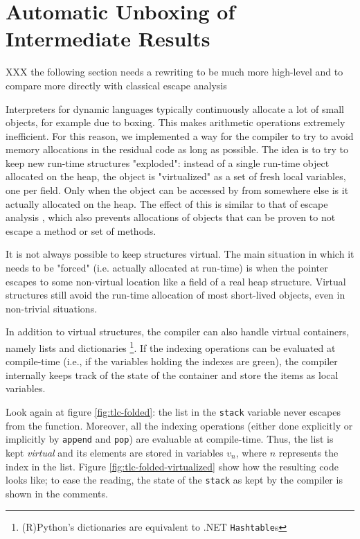 \section{Automatic Unboxing of Intermediate Results}
\label{sec:virtuals}

XXX the following section needs a rewriting to be much more high-level and to
compare more directly with classical escape analysis

Interpreters for dynamic languages typically continuously allocate a lot of small
objects, for example due to boxing. This makes arithmetic operations extremely
inefficient. For this reason, we
implemented a way for the compiler to try to avoid memory allocations in the
residual code as long as possible. The idea is to try to keep new
run-time structures "exploded": instead of a single run-time object allocated on
the heap, the object is "virtualized" as a set
of fresh local variables, one per field. Only when the object can be accessed by from
somewhere else is it actually allocated on the heap. The effect of this is similar to that of
escape analysis \cite{XXX}, which also prevents allocations of objects that can
be proven to not escape a method or set of methods.

It is not always possible to keep structures virtual.  The main
situation in which it needs to be "forced" (i.e. actually allocated at
run-time) is when the pointer escapes to some non-virtual location like
a field of a real heap structure.  Virtual structures still avoid the run-time
 allocation of most short-lived objects, even in non-trivial situations.  

In addition to virtual structures, the compiler can also handle virtual
containers, namely lists and dictionaries \footnote{(R)Python's dictionaries
  are equivalent to .NET \lstinline{Hashtable}s}.  If the indexing operations
can be evaluated at compile-time (i.e., if the variables holding the indexes
are green), the compiler internally keeps track of the state of the container
and store the items as local variables.

Look again at figure \ref{fig:tlc-folded}: the list in the \lstinline{stack}
variable never escapes from the function.  Moreover, all the indexing
operations (either done explicitly or implicitly by \lstinline{append} and
\lstinline{pop}) are evaluable at compile-time.  Thus, the list is kept
\emph{virtual} and its elements are stored in variables $v_n$, where $n$
represents the index in the list.  Figure \ref{fig:tlc-folded-virtualized}
show how the resulting code looks like; to ease the reading, the state of the
\lstinline{stack} as kept by the compiler is shown in the comments.

